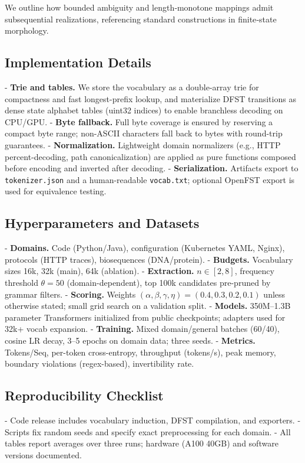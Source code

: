 We outline how bounded ambiguity and length‑monotone mappings admit subsequential realizations, referencing standard constructions in finite‑state morphology.

\subsection{Implementation Details}

- \textbf{Trie and tables.} We store the vocabulary as a double-array trie for compactness and fast longest-prefix lookup, and materialize DFST transitions as dense state\,\times\,alphabet tables (uint32 indices) to enable branchless decoding on CPU/GPU.
- \textbf{Byte fallback.} Full byte coverage is ensured by reserving a compact byte range; non-ASCII characters fall back to bytes with round-trip guarantees.
- \textbf{Normalization.} Lightweight domain normalizers (e.g., HTTP percent-decoding, path canonicalization) are applied as pure functions composed before encoding and inverted after decoding.
- \textbf{Serialization.} Artifacts export to \texttt{tokenizer.json} and a human-readable \texttt{vocab.txt}; optional OpenFST export is used for equivalence testing.

\subsection{Hyperparameters and Datasets}

- \textbf{Domains.} Code (Python/Java), configuration (Kubernetes YAML, Nginx), protocols (HTTP traces), biosequences (DNA/protein).
- \textbf{Budgets.} Vocabulary sizes 16k, 32k (main), 64k (ablation).
- \textbf{Extraction.} $n\!\in\![2,8]$, frequency threshold $\theta\!=\!50$ (domain-dependent), top 100k candidates pre-pruned by grammar filters.
- \textbf{Scoring.} Weights $(\alpha,\beta,\gamma,\eta)\!=\!(0.4,0.3,0.2,0.1)$ unless otherwise stated; small grid search on a validation split.
- \textbf{Models.} 350M–1.3B parameter Transformers initialized from public checkpoints; adapters used for 32k+ vocab expansion.
- \textbf{Training.} Mixed domain/general batches (60/40), cosine LR decay, 3–5 epochs on domain data; three seeds.
- \textbf{Metrics.} Tokens/Seq, per-token cross-entropy, throughput (tokens/s), peak memory, boundary violations (regex-based), invertibility rate.

\subsection{Reproducibility Checklist}

- Code release includes vocabulary induction, DFST compilation, and exporters.
- Scripts fix random seeds and specify exact preprocessing for each domain.
- All tables report averages over three runs; hardware (A100 40GB) and software versions documented.
